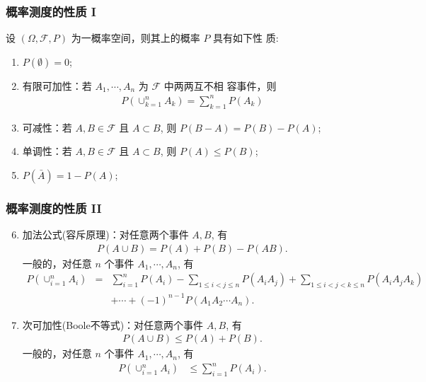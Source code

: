 \begin{frame}%
	\frametitle{概率测度的性质 I}
	\begin{thm}
		设 $(\Omega,\mathcal{F},P)$ 为一概率空间，则其上的概率 $P$ 具有如下性
		质:
		\begin{enumerate}[<+-|alert@+>]
			\item $P(\emptyset)=0$;
			\item 有限可加性：若 $A_1,\cdots, A_n$ 为 $\mathcal{F}$ 中两两互不相
			      容事件，则
			      \begin{eqnarray*}
				      P(\cup_{k=1}^n A_k)=\sum_{k=1}^nP(A_k)
			      \end{eqnarray*}
			\item 可减性：若 $A, B\in \mathcal{F}$ 且 $A\subset
				      B$, 则 $P (B-A)=P (B)-P (A)$;
			\item 单调性：若 $A, B\in \mathcal{F}$ 且 $A\subset B$,
			      则 $P (A)\leq P (B)$;
			\item $P(\bar{A})=1-P(A)$;
		\end{enumerate}
	\end{thm}
\end{frame}
\begin{frame}
	\frametitle{概率测度的性质 II}

	\begin{enumerate}[<+-|alert@+>]
		\setcounter{enumi}{5}

		\item 加法公式(容斥原理)：对任意两个事件 $A,B$, 有
		      \begin{eqnarray}\label{eq:plusformulatwo}
			      P(A\cup B)=P(A)+P(B)-P(AB).
		      \end{eqnarray}
		      一般的，对任意 $n$ 个事件 $A_1,\cdots,A_n$, 有
		      {\small \begin{eqnarray}
			      \label{eq:plusformula}
			      P(\cup_{i=1}^nA_i)&=&\sum_{i=1}^nP(A_i)-\sum_{1\leq i<j\leq n}P(A_iA_j)+\sum_{1\leq i<j<k\leq n}P(A_iA_jA_k)\nonumber\\
			      && +\cdots+(-1)^{n-1}P(A_1A_2\cdots A_n).
		      \end{eqnarray}}
		\item 次可加性(Boole不等式)：对任意两个事件 $A,B$, 有
		      \begin{eqnarray*}
			      P(A\cup B)\leq P(A)+P(B).
		      \end{eqnarray*}
		      一般的，对任意 $n$ 个事件 $A_1,\cdots,A_n$, 有
		     {\small  \begin{align*}
			      P(\cup_{i=1}^nA_i)&\leq \sum_{i=1}^nP(A_i).
		      \end{align*}}
	\end{enumerate}

\end{frame}

